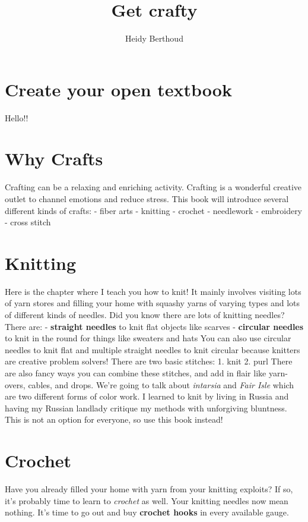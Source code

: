 \documentclass[
  openany]{book}
\title{Get crafty}
\author{Heidy Berthoud}
\date{}
\begin{document}
\maketitle

{
\setcounter{tocdepth}{1}
\tableofcontents
}
\hypertarget{create-your-open-textbook}{%
\chapter{Create your open textbook}\label{create-your-open-textbook}}

Hello!!

\hypertarget{why-crafts}{%
\chapter{Why Crafts}\label{why-crafts}}

Crafting can be a relaxing and enriching activity. Crafting is a wonderful creative outlet to channel emotions and reduce stress.
This book will introduce several different kinds of crafts:
- fiber arts
- knitting
- crochet
- needlework
- embroidery
- cross stitch

\hypertarget{knitting}{%
\chapter{Knitting}\label{knitting}}

Here is the chapter where I teach you how to knit! It mainly involves visiting lots of yarn stores and filling your home with squashy yarns of varying types and lots of different kinds of needles.
Did you know there are lots of knitting needles? There are:
- \textbf{straight needles} to knit flat objects like scarves
- \textbf{circular needles} to knit in the round for things like sweaters and hats
You can also use circular needles to knit flat and multiple straight needles to knit circular because knitters are creative problem solvers!
There are two basic stitches:
1. knit
2. purl
There are also fancy ways you can combine these stitches, and add in flair like yarn-overs, cables, and drops.
We're going to talk about \emph{intarsia} and \emph{Fair Isle} which are two different forms of color work.
I learned to knit by living in Russia and having my Russian landlady critique my methods with unforgiving bluntness. This is not an option for everyone, so use this book instead!

\hypertarget{crochet}{%
\chapter{Crochet}\label{crochet}}

Have you already filled your home with yarn from your knitting exploits? If so, it's probably time to learn to \emph{crochet} as well.
Your knitting needles now mean nothing. It's time to go out and buy \textbf{crochet hooks} in every available gauge.
\end{document}
